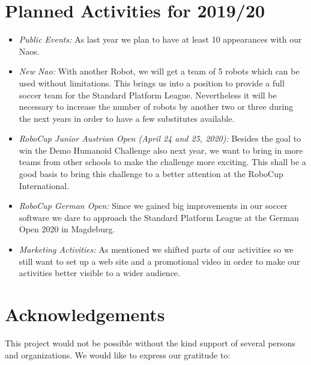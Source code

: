 \documentclass[11pt]{article}
\begin{document}
\section{Planned Activities for 2019/20}

\begin{itemize}
	\item {\em Public Events:}  As last year we plan to have at least 10 appearances with our Naos.
	
	\item {\em New Nao:} With another Robot, we will get a team of 5 robots which can be used without limitations. This brings us into a position to provide a full soccer team for the Standard Platform League. Nevertheless it will be necessary to increase the number of robots by another two or three during the next years in order to have a few substitutes available.
	
	\item {\em RoboCup Junior Austrian Open (April 24 and 25, 2020):} Besides the goal to win the Demo Humanoid Challenge also next year, we want to bring in more teams from other schools to make the challenge more exciting. This shall be a good basis to bring this challenge to a better attention at the RoboCup International.
	
	\item {\em RoboCup German Open:} Since we gained big improvements in our soccer software we dare to approach the Standard Platform League at the German Open 2020 in Magdeburg.
	
	\item {\em Marketing Activities:} As mentioned we shifted parts of our activities so we still want to set up a web site and a promotional video in order to make our activities better visible to a wider audience.
\end{itemize}

\section{Acknowledgements}
This project would not be possible without the kind support of several persons and organizations. We would like to express our gratitude to:
\end{document}
